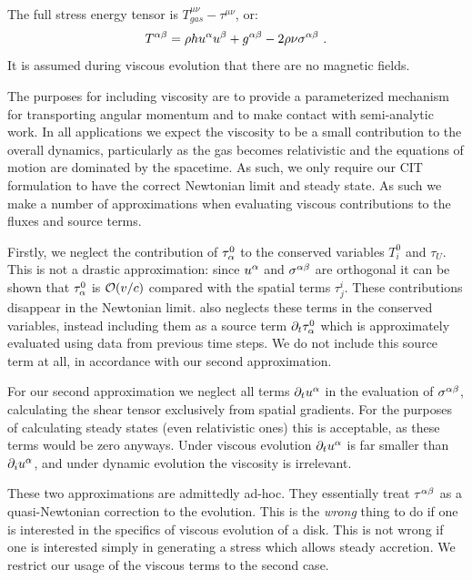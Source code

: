The full stress energy tensor is $T^{\mu\nu}_{gas} - \tau^{\mu\nu}$, or:
\begin{equation}
	T^{\alpha \beta} = \rho h u^\alpha u^\beta + g^{\alpha\beta} - 2 \rho \nu \sigma^{\alpha \beta}\ .
\end{equation}
It is assumed during viscous evolution that there are no magnetic fields.

The purposes for including viscosity are to provide a parameterized mechanism for transporting angular momentum and to make contact with semi-analytic work.  In all applications we expect the viscosity to be a small contribution to the overall dynamics, particularly as the gas becomes relativistic and the equations of motion are dominated by the spacetime.  As such, we only require our CIT formulation to have the correct Newtonian limit and steady state.  As such we make a number of approximations when evaluating viscous contributions to the fluxes and source terms.

Firstly, we neglect the contribution of $\tau^0_\alpha$ to the conserved variables $T^0_i$ and $\tau_U$.  This is not a drastic approximation: since $u^\alpha$ and $\sigma^{\alpha \beta}$ are orthogonal it can be shown that $\tau^0_\alpha$ is $\mathcal{O}(v/c)$ compared with the spatial terms $\tau^i_j$.  These contributions disappear in the Newtonian limit.  \citet{Duez04} also neglects these terms in the conserved variables, instead including them as a source term $\partial_t \tau^0_\alpha$ which is approximately evaluated using data from previous time steps.  We do not include this source term at all, in accordance with our second approximation.

For our second approximation we neglect all terms $\partial_t u^\alpha$ in the evaluation of $\sigma^{\alpha \beta}$, calculating the shear tensor exclusively from spatial gradients.  For the purposes of calculating steady states (even relativistic ones) this is acceptable, as these terms would be zero anyways.  Under viscous evolution $\partial_t u^\alpha$ is far smaller than $\partial_i u^\alpha$, and under dynamic evolution the viscosity is irrelevant. 

These two approximations are admittedly ad-hoc.  They essentially treat $\tau^{\alpha\beta}$ as a quasi-Newtonian correction to the evolution. This is the \emph{wrong} thing to do if one is interested in the specifics of viscous evolution of a disk.  This is not wrong if one is interested simply in generating a stress which allows steady accretion.  We restrict our usage of the viscous terms to the second case.

